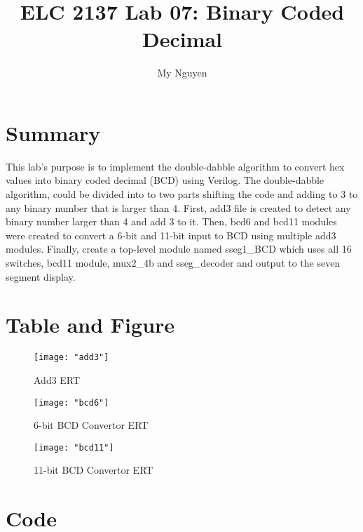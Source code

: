 \documentclass[11pt]{article}
\newcommand{\Verilog}[2][]{%
	
}
\begin{document}
\title{ELC 2137 Lab 07: Binary Coded Decimal}
\author{My Nguyen}

\maketitle

\section*{Summary}
This lab's purpose is to implement the double-dabble algorithm to convert hex values into binary coded decimal (BCD) using Verilog. The double-dabble algorithm, could be divided into to two parts shifting the code and adding to 3 to any binary number that is larger than 4. First, add3 file is created to detect any binary number larger than 4 and add 3 to it. Then, bcd6 and bcd11 modules were created to convert a 6-bit and 11-bit input to BCD using multiple add3 modules. Finally, create a top-level module named sseg1\_BCD which uses all 16 switches, bcd11 module, mux2\_4b and sseg\_decoder and output to the seven segment display.

\section*{Table and Figure}
\begin{figure}[ht]
	\centering
	\texttt{[image: "add3"]}
	\caption{Add3 ERT}
	\texttt{[image: "bcd6"]}
	\caption{6-bit BCD Convertor ERT}
	\texttt{[image: "bcd11"]}
	\caption{11-bit BCD Convertor ERT}
\end{figure}

\section*{Code}
\Verilog[firstline=23,caption=Add3 Implementation]{../verilog_code/add3.sv}
\Verilog[firstline=23,caption=Add3 Test Bench]{../verilog_code/add3_test.sv}
\Verilog[firstline=23,caption=6-bit BCD Convertor Implementation]{../verilog_code/bcd6.sv}
\Verilog[firstline=23,caption=6-bit BCD Convertor Test Bench]{../verilog_code/bcd6_test.sv}
\Verilog[firstline=23,caption=11-bit BCD Convertor Implementation]{../verilog_code/bcd11.sv}
\Verilog[firstline=23,caption=11-bit BCD Convertor Test Bench]{../verilog_code/bcd11_test.sv}
\Verilog[firstline=23,caption=11-bit BCD Convertor Test Bench]{../verilog_code/sseg1_BCD.sv}
\end{document}
